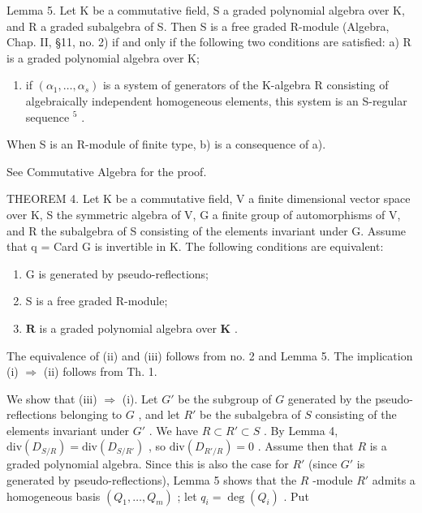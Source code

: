 Lemma 5. Let K be a commutative field, S a graded polynomial algebra over K, and R a graded subalgebra of S. Then S is a free graded R-module (Algebra, Chap. II, §11, no. 2) if and only if the following two conditions are satisfied: a) R is a graded polynomial algebra over K;

\begin{enumerate}
\def\labelenumi{\alph{enumi})}
\setcounter{enumi}{1}
\tightlist
\item
  if \((\alpha_{1},\ldots,\alpha_{s})\) is a system of generators of the K-algebra R consisting of algebraically independent homogeneous elements, this system is an S-regular sequence \(^{5}\) .
\end{enumerate}

When S is an R-module of finite type, b) is a consequence of a).

See Commutative Algebra for the proof.

THEOREM 4. Let K be a commutative field, V a finite dimensional vector space over K, S the symmetric algebra of V, G a finite group of automorphisms of V, and R the subalgebra of S consisting of the elements invariant under G. Assume that q = Card G is invertible in K. The following conditions are equivalent:

\begin{enumerate}
\def\labelenumi{(\roman{enumi})}
\item
  G is generated by pseudo-reflections;
\item
  S is a free graded R-module;
\item
  \(\mathbf{R}\) is a graded polynomial algebra over \(\mathbf{K}\) .
\end{enumerate}

The equivalence of (ii) and (iii) follows from no. 2 and Lemma 5. The implication (i) \(\Longrightarrow\) (ii) follows from Th. 1.

We show that (iii) \(\Longrightarrow\) (i). Let \(G'\) be the subgroup of \(G\) generated by the pseudo-reflections belonging to \(G\) , and let \(R'\) be the subalgebra of \(S\) consisting of the elements invariant under \(G'\) . We have \(R \subset R' \subset S\) . By Lemma 4, \(\text{div}(D_{S/R}) = \text{div}(D_{S/R'})\) , so \(\text{div}(D_{R'/R}) = 0\) . Assume then that \(R\) is a graded polynomial algebra. Since this is also the case for \(R'\) (since \(G'\) is generated by pseudo-reflections), Lemma 5 shows that the \(R\) -module \(R'\) admits a homogeneous basis \((Q_1, \ldots, Q_m)\) ; let \(q_i = \deg(Q_i)\) . Put

